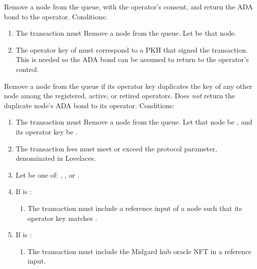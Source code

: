 \documentclass[../midgard.tex]{subfiles}
\begin{document}
\begin{description}
\begin{itemize}
\begin{enumerate}
            \end{enumerate}
        \end{itemize}
    \item[Deregister Operator.] Remove a node from the  queue, with the operator's consent, and return the ADA bond to the operator.
      Conditions:
        \begin{enumerate}
            \item The transaction must Remove a node from the  queue.
              Let  be that node.
            \item The operator key of  must correspond to a PKH that signed the transaction.
              This is needed so the ADA bond can be assumed to return to the operator's control.
        \end{enumerate}
    \item[Slash Duplicate Operator.] Remove a node from the  queue if its operator key duplicates the key of any other node among the registered, active, or retired operators.
      Does \emph{not} return the duplicate node's ADA bond to its operator.
      Conditions:
        \begin{enumerate}
            \item The transaction must Remove a node from the  queue.
              Let that node be , and its operator key be .
            \item The transaction fees must meet or exceed the  protocol parameter, denominated in Lovelaces.
            \item Let  be one of: , , or .
            \item If  is :
                \begin{enumerate}
                    \item The transaction must include a reference input of a  node such that its operator key matches .
                \end{enumerate}
            \item If  is :
                \begin{enumerate}
                    \item The transaction must include the Midgard hub oracle NFT in a reference input.

\end{enumerate}
\end{enumerate}
\end{description}
\end{document}
